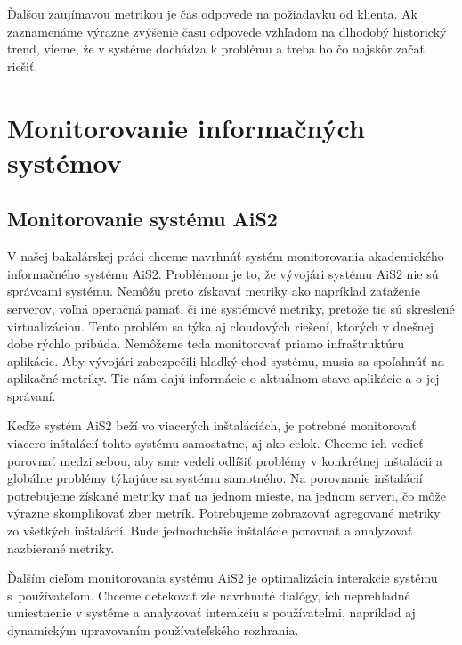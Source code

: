\documentclass[a4paper, upjsfrontpage, disablespecwarning, thesismargins, thesislinespacing]{rnthesis}
\begin{document}
Ďalšou zaujímavou metrikou je čas odpovede na požiadavku od klienta.
Ak zaznamenáme výrazne zvýšenie času odpovede vzhľadom na dlhodobý historický trend, vieme, že v systéme dochádza k problému a treba ho čo najskôr začať riešiť.



\chapter{Monitorovanie informačných systémov}

\section{Monitorovanie systému AiS2}

V našej bakalárskej práci chceme navrhnúť systém monitorovania akademického informačného systému AiS2.
Problémom je to, že vývojári systému AiS2 nie sú správcami systému.
Nemôžu preto získavať metriky ako napríklad zaťaženie serverov, voľná operačná pamäť, či iné systémové metriky, pretože tie sú skreslené virtualizáciou.
Tento problém sa týka aj cloudových riešení, ktorých v dnešnej dobe rýchlo pribúda.
Nemôžeme teda monitorovať priamo infraštruktúru aplikácie.
Aby vývojári zabezpečili hladký chod systému, musia sa spoľahnúť na aplikačné metriky.
Tie nám dajú informácie o aktuálnom stave aplikácie a o jej správaní.

Keďže systém AiS2 beží vo viacerých inštaláciách, 
	je potrebné monitorovať viacero inštalácií tohto systému samostatne, aj ako celok.
Chceme ich vedieť porovnať medzi sebou, 
	aby sme vedeli odlíšiť problémy v konkrétnej inštalácii a globálne problémy týkajúce sa systému samotného.
Na porovnanie inštalácií potrebujeme získané metriky mať na jednom mieste, na jednom serveri, čo môže výrazne skomplikovať zber metrík.
Potrebujeme zobrazovať agregované metriky zo všetkých inštalácií.
Bude jednoduchšie inštalácie porovnať a analyzovať nazbierané metriky.

Ďalším cieľom monitorovania systému AiS2 je optimalizácia interakcie systému s~používateľom.
Chceme detekovať zle navrhnuté dialógy, ich neprehľadné umiestnenie v systéme a analyzovať interakciu s používateľmi, napríklad aj dynamickým upravovaním používateľského rozhrania.
\end{document}
